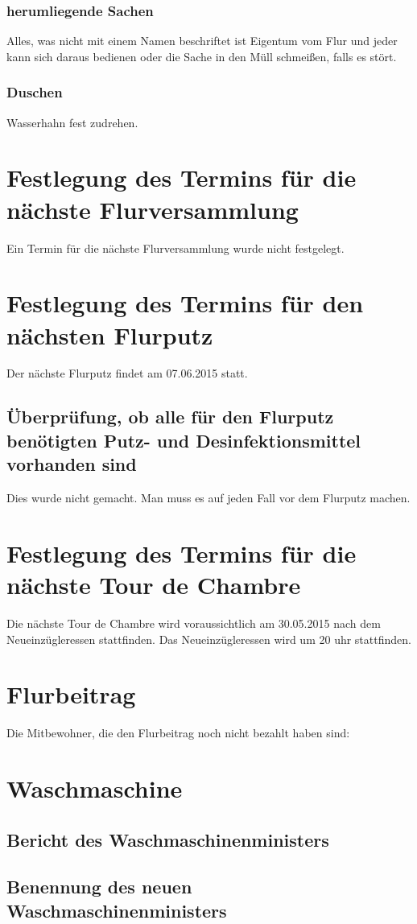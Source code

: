 \documentclass[10pt,a4paper,final]{article}
\begin{document}
\subsubsection{herumliegende Sachen}
Alles, was nicht mit einem Namen beschriftet ist Eigentum vom Flur und jeder kann sich daraus bedienen oder die Sache in den Müll schmeißen, falls es stört.
\subsubsection{Duschen}
Wasserhahn fest zudrehen.
\section{Festlegung des Termins für die nächste Flurversammlung}
Ein Termin für die nächste Flurversammlung wurde nicht festgelegt.
\section{Festlegung des Termins für den nächsten Flurputz}
Der nächste Flurputz findet am 07.06.2015 statt.
	\subsection{Überprüfung, ob alle für den Flurputz benötigten Putz- und Desinfektionsmittel vorhanden sind}
	Dies wurde nicht gemacht. Man muss es auf jeden Fall vor dem Flurputz machen.
\section{Festlegung des Termins für die nächste Tour de Chambre}
Die nächste Tour de Chambre wird voraussichtlich am 30.05.2015 nach dem Neueinzügleressen stattfinden. Das Neueinzügleressen wird um 20 uhr stattfinden. 
\section{Flurbeitrag}
Die Mitbewohner, die den Flurbeitrag noch nicht bezahlt haben sind:
\section{Waschmaschine}
\subsection{Bericht des Waschmaschinenministers}
\subsection{Benennung des neuen Waschmaschinenministers}
\end{document}
